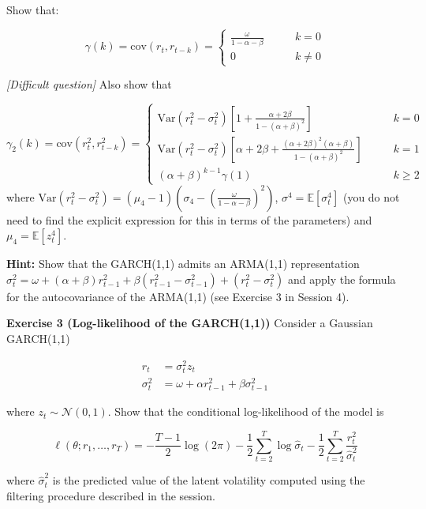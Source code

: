 \documentclass[
]{book}
\begin{document}
Show that:

\[
\gamma(k) = \text{cov}(r_t, r_{t-k}) = 
\begin{cases}
\frac{\omega}{1-\alpha-\beta}  \qquad  & k = 0 \\
0 & k \neq 0
\end{cases}
\]

\emph{{[}Difficult question{]}} Also show that

\[
\gamma_2(k) = \text{cov}(r^2_t, r^2_{t-k}) = 
\begin{cases}
\text{Var}(r^2_t - \sigma^2_t)\left[1+\frac{\alpha+2\beta}{1-(\alpha+\beta)^2}\right] \qquad  & k = 0 \\[1em]
\text{Var}(r^2_t - \sigma^2_t)\left[\alpha+2\beta+\frac{(\alpha+2\beta)^2 (\alpha+\beta)}{1-(\alpha+\beta)^2}\right] \qquad  & k = 1 \\[1em]
(\alpha+\beta)^{k-1}\gamma(1) & k \geq 2
\end{cases}
\]
where \(\text{Var}(r^2_t - \sigma^2_t) = (\mu_4 - 1)\left( \sigma_4 - \left(\frac{\omega}{1-\alpha-\beta}\right)^2 \right)\), \(\sigma^4 = \mathbb{E}[\sigma^4_t]\) (you do not need to find the explicit expression for this in terms of the parameters) and \(\mu_4 = \mathbb{E}[z_t^4]\).

\textbf{Hint:} Show that the GARCH(1,1) admits an ARMA(1,1) representation \(\sigma_t^2 = \omega + (\alpha+\beta)r^2_{t-1} + \beta(r^2_{t-1}-\sigma^2_{t-1}) + (r^2_{t}-\sigma^2_{t})\) and apply the formula for the autocovariance of the ARMA(1,1) (see Exercise 3 in Session 4).

\textbf{Exercise 3 (Log-likelihood of the GARCH(1,1))}
Consider a Gaussian GARCH(1,1)

\[
\begin{aligned}
r_t &= \sigma^2_t z_t \\[1ex]
\sigma^2_t &= \omega + \alpha r_{t-1}^2 + \beta \sigma^2_{t-1}
\end{aligned}
\]

where \(z_t \sim \mathcal{N}(0, 1)\). Show that the conditional log-likelihood of the model is

\[
\ell(\theta; r_1, \dots, r_T) = -\frac{T-1}{2}\log(2\pi) - \frac{1}{2}\sum_{t=2}^T\log\hat\sigma_t -\frac{1}{2} \sum_{t=2}^T \frac{r_t^2}{\hat\sigma^2_t}
\]

where \(\hat\sigma_t^2\) is the predicted value of the latent volatility computed using the filtering procedure described in the session.

  
\end{document}
